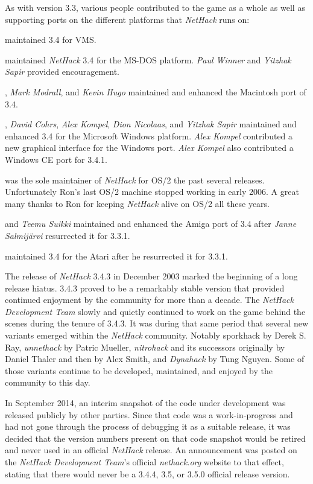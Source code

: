 \medskip
As with version 3.3, various people contributed to the game as a whole as
well as supporting ports on the different platforms that {\it NetHack\/}
runs on:

\medskip
{} maintained 3.4 for VMS.

\medskip
{} maintained {\it NetHack\/} 3.4 for the MS-DOS
platform.
{\it Paul Winner} and {\it Yitzhak Sapir} provided encouragement.

\medskip
{}, {\it Mark Modrall}, and {\it Kevin Hugo} maintained and
enhanced the Macintosh port of 3.4.

\medskip
{}, {\it David Cohrs}, {\it Alex Kompel},
{\it Dion Nicolaas}, and
{\it Yitzhak Sapir} maintained and enhanced 3.4 for the Microsoft Windows
platform.
{\it Alex Kompel} contributed a new graphical interface for the Windows port.
{\it Alex Kompel} also contributed a Windows CE port for 3.4.1.

\medskip
{} was the sole maintainer of {\it NetHack\/} for
OS/2 the past
several releases. Unfortunately Ron's last OS/2 machine stopped working in
early 2006. A great many thanks to Ron for keeping {\it NetHack\/} alive on
OS/2 all these years.

\medskip
{} and {\it Teemu Suikki} maintained
and enhanced the Amiga port of 3.4 after {\it Janne Salmij\"{a}rvi} resurrected
it for 3.3.1.

\medskip
{} maintained 3.4 for the Atari after he
resurrected it for 3.3.1.

\medskip
The release of {\it NetHack\/} 3.4.3 in December 2003 marked the beginning of
a long release hiatus. 3.4.3 proved to be a remarkably stable version that
provided continued enjoyment by the community for more than a decade. The
{\it NetHack Development Team} slowly and quietly continued to work on the game behind the scenes
during the tenure of 3.4.3. It was during that same period that several new
variants emerged within the {\it NetHack\/} community. Notably sporkhack by
Derek S. Ray, {\it unnethack\/} by Patric Mueller, {\it nitrohack\/} and its
successors originally by Daniel Thaler and then by Alex Smith, and
{\it Dynahack\/} by Tung Nguyen.
Some of those variants continue to be
developed, maintained, and enjoyed by the community to this day.

\medskip
In September 2014, an interim snapshot of the code under development was
released publicly by other parties.
Since that code was a work-in-progress
and had not gone through the process of debugging it as a suitable release,
it was decided that the version numbers present on that code snapshot would
be retired and never used in an official {\it NetHack\/} release.
An announcement was posted on the {\it NetHack Development Team}'s official
{\it nethack.org\/} website
to that effect, stating that there would never be a 3.4.4, 3.5, or 3.5.0
official release version.

